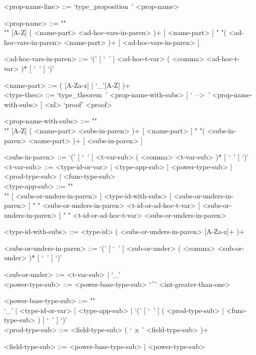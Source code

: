 \documentclass{article}
\begin{document}
\begin{grammar}
<prop-name-line> ::= `type_proposition\ ' <prop-name>

<prop-name> ::=  ""\\""
[A-Z] ( <name-part> <ad-hoc-vars-in-paren> )+ [ <name-part> ]
\alt " "( <ad-hoc-vars-in-paren> <name-part> )+ [ <ad-hoc-vars-in-paren> ]

<ad-hoc-vars-in-paren> ::=
`(' [ `\ ' ] <ad-hoc-t-var> ( <comma> <ad-hoc-t-var> )* [ `\ ' ] `)'

<name-part> ::= ( [A-Za-z] | `_'[A-Z] )+
\\

\newpage
<type-theo> ::= 
`type_theorem\ ' <prop-name-with-subs> [ `\ -->\ ' <prop-name-with-subs> ] <nl> 
`proof' <proof>

<prop-name-with-subs> ::=  ""\\""
[A-Z] ( <name-part> <subs-in-paren> )+ [ <name-part> ]
\alt " "( <subs-in-paren> <name-part> )+ [ <subs-in-paren> ]

<subs-in-paren> ::=
`(' [ `\ ' ] <t-var-sub> ( <comma> <t-var-sub> )* [ `\ ' ] `)'
\\

<t-var-sub> ::=
<type-id-or-var> | <type-app-sub> | <power-type-sub> | <prod-type-sub> |
<func-type-sub> 
\\

<type-app-sub> ::= ""\\""
[ <subs-or-unders-in-paren> ] <type-id-with-subs> [ <subs-or-unders-in-paren> ]
\alt " "
<subs-or-unders-in-paren> <t-id-or-ad-hoc-t-var> [ <subs-or-unders-in-paren> ]
\alt " "
<t-id-or-ad-hoc-t-var> <subs-or-unders-in-paren>

<type-id-with-subs> ::= <type-id> ( <subs-or-unders-in-paren> [A-Za-z]+ )+

<subs-or-unders-in-paren> ::=
`(' [ `\ ' ] <sub-or-under> ( <comma> <sub-or-under> )* [ `\ ' ] `)'

<sub-or-under> ::= <t-var-sub> | `_'
\\

<power-type-sub> ::= <power-base-type-sub> `^' <int-greater-than-one>

<power-base-type-sub> ::= ""\\
`_' | <type-id-or-var> | <type-app-sub> |
`(' [ `\ ' ] ( <prod-type-sub> | <func-type-sub> ) [ `\ ' ] `)'
\\

<prod-type-sub> ::= <field-type-sub> ( `\ x\ ' <field-type-sub> )+

<field-type-sub> ::= <power-base-type-sub> | <power-type-sub>
\\


\end{grammar}
\end{document}
